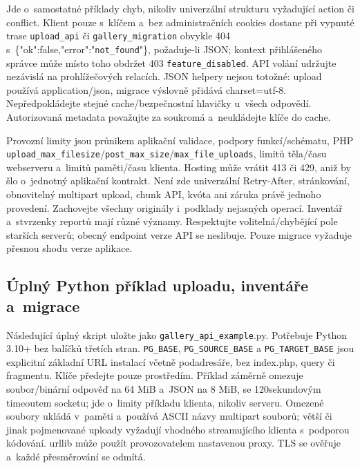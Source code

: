 \documentclass[11pt,a4paper]{article}
\newcommand{\codeword}[1]{\nolinkurl{#1}}
\begin{document}
Jde o~samostatné příklady chyb, nikoliv univerzální strukturu vyžadující action či conflict.
Klient pouze s~klíčem a~bez administračních cookies dostane při vypnuté trase
\codeword{upload_api} či \codeword{gallery_migration} obvykle 404
s~\{"ok":false,"error":"\codeword{not_found}"\}, požaduje-li JSON; kontext přihlášeného
správce může místo toho obdržet 403 \codeword{feature_disabled}. API volání udržujte
nezávislá na prohlížečových relacích. JSON helpery nejsou totožné: upload používá
application/json, migrace výslovně přidává charset=utf-8. Nepředpokládejte stejné
cache/bezpečnostní hlavičky u~všech odpovědí. Autorizovaná metadata považujte za soukromá
a~neukládejte klíče do cache.

Provozní limity jsou průnikem aplikační validace, podpory funkcí/schématu, PHP
\codeword{upload_max_filesize}/\codeword{post_max_size}/\codeword{max_file_uploads}, limitů
těla/času webserveru a~limitů paměti/času klienta. Hosting může vrátit 413 či 429, aniž by
šlo o~jednotný aplikační kontrakt. Není zde univerzální Retry-After, stránkování,
obnovitelný multipart upload, chunk API, kvóta ani záruka právě jednoho provedení.
Zachovejte všechny originály i~podklady nejasných operací. Inventář a~stvrzenky reportů mají
různé významy. Respektujte volitelná/chybějící pole starších serverů; obecný endpoint verze
API se neslibuje. Pouze migrace vyžaduje přesnou shodu verze aplikace.

\subsection{\texorpdfstring{Úplný Python příklad uploadu, inventáře a~migrace}{Úplný Python příklad uploadu, inventáře a migrace}}

\label{api352:complete-client}

Následující úplný skript uložte jako \codeword{gallery_api_example}.py. Potřebuje Python
3.10+ bez balíčků třetích stran. \codeword{PG_BASE}, \codeword{PG_SOURCE_BASE} a
\codeword{PG_TARGET_BASE} jsou explicitní základní URL instalací včetně podadresáře, bez
index.php, query či fragmentu. Klíče předejte pouze prostředím. Příklad záměrně omezuje
soubor/binární odpověď na 64 MiB a~JSON na 8 MiB, se 120sekundovým timeoutem socketu; jde
o~limity příkladu klienta, nikoliv serveru. Omezené soubory ukládá v~paměti a~používá ASCII
názvy multipart souborů; větší či jinak pojmenované uploady vyžadují vhodného streamujícího
klienta s~podporou kódování. urllib může použít provozovatelem nastavenou proxy. TLS se
ověřuje a~každé přesměrování se odmítá.
\end{document}
